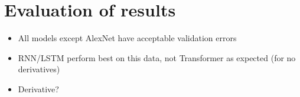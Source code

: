 \section{Evaluation of results}

\begin{comment}
    This Chapter (or possibly section of the conclusions) is
distinct from your results. It must contain your critical
evaluation of your work as compared to previous
analysis, algorithms, products, and when related to
your original objectives. To what extent have your
original objectives been fulfilled? If they have
changed, what is your rationale for this? What are the
advantages, disadvantages of your approach
compared with related work? How does the scope of
your work differ from related work? Examiners expect
your project report to show evidence of your ability to
think as an engineer, and that includes the ability to
critically reflect on your own work and evaluate its
significance.\\ \newline \noindent Material here will compare project outcomes with
initial objectives and requirements captured. Usually
your Interim Report will contain these. Where these
have changed significantly over the course of the
project this should be explained and reasons given.
This section should not require examiners to read
your Interim Report, and will not reference it. Changes
between final and initial objectives should be
explained in a self-contained manner.\\ \newline \noindent Note that here you will reference and summarise,
rather than repeat, your description of Requirements
Capture earlier in the Final Report. 
\end{comment}


\begin{itemize}
    \item All models except AlexNet have acceptable validation errors
    \item RNN/LSTM perform best on this data, not Transformer as expected (for no derivatives)
    \item Derivative?
\end{itemize}
